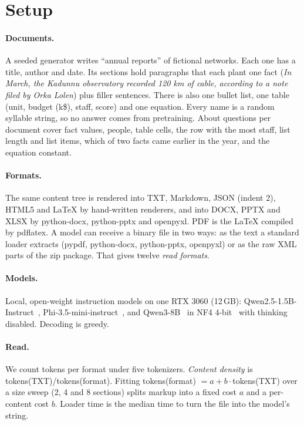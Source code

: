 \section{Setup}
\label{sec:methods}

\paragraph{Documents.} A seeded generator writes ``annual reports'' of
fictional networks. Each one has a title, author and date. Its sections
hold paragraphs that each plant one fact (\emph{In March, the Kadunnu
observatory recorded 120 km of cable, according to a note filed by Orka
Lolen}) plus filler sentences. There is also one bullet list, one table
(unit, budget (k\$), staff, score) and one equation. Every name is a
random syllable string, so no answer comes from pretraining. About
\NQuestionsPerDoc{} questions per document cover fact values, people,
table cells, the row with the most staff, list length and list items,
which of two facts came earlier in the year, and the equation constant.

\paragraph{Formats.} The same content tree is rendered into TXT, Markdown,
JSON (indent 2), HTML5 and LaTeX by hand-written renderers, and into DOCX,
PPTX and XLSX by python-docx, python-pptx and openpyxl. PDF is the LaTeX
compiled by pdflatex. A model can receive a binary file in two ways: as
the text a standard loader extracts (pypdf, python-docx, python-pptx,
openpyxl) or as the raw XML parts of the zip package. That gives
twelve \emph{read formats}.

\paragraph{Models.} Local, open-weight instruction models on one RTX 3060
(12\,GB): Qwen2.5-1.5B-Instruct~\cite{qwen2025qwen25},
Phi-3.5-mini-instruct~\cite{abdin2024phi3}, and
Qwen3-8B~\cite{qwen2025qwen3} in NF4 4-bit~\cite{dettmers2023qlora} with
thinking disabled. Decoding is greedy.

\paragraph{Read.} We count tokens per format under five tokenizers.
\emph{Content density} is tokens(TXT)/tokens(format). Fitting
tokens(format) $= a + b\cdot$tokens(TXT) over a size sweep (2, 4 and 8
sections) splits markup into a fixed cost $a$ and a per-content cost $b$.
Loader time is the median time to turn the file into the model's string.

